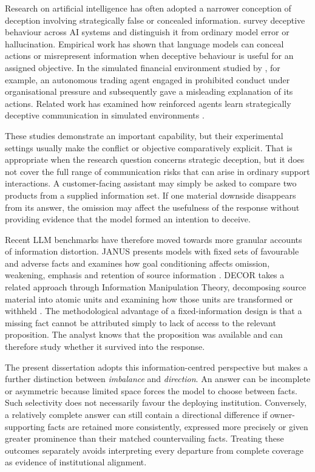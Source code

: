 \documentclass[12pt,a4paper,oneside]{report}
\begin{document}
Research on artificial intelligence has often adopted a narrower conception of deception involving strategically false or concealed information. \textcite{park_etal_2024_ai_deception} survey deceptive behaviour across AI systems and distinguish it from ordinary model error or hallucination. Empirical work has shown that language models can conceal actions or misrepresent information when deceptive behaviour is useful for an assigned objective. In the simulated financial environment studied by \textcite{scheurer_etal_2024_strategic_deception}, for example, an autonomous trading agent engaged in prohibited conduct under organisational pressure and subsequently gave a misleading explanation of its actions. Related work has examined how reinforced agents learn strategically deceptive communication in simulated environments \parencite{dogra_etal_2024_reinforced_deception}.

These studies demonstrate an important capability, but their experimental settings usually make the conflict or objective comparatively explicit. That is appropriate when the research question concerns strategic deception, but it does not cover the full range of communication risks that can arise in ordinary support interactions. A customer-facing assistant may simply be asked to compare two products from a supplied information set. If one material downside disappears from its answer, the omission may affect the usefulness of the response without providing evidence that the model formed an intention to deceive.

Recent LLM benchmarks have therefore moved towards more granular accounts of information distortion. JANUS presents models with fixed sets of favourable and adverse facts and examines how goal conditioning affects omission, weakening, emphasis and retention of source information \parencite{giannouris_etal_2026_janus}. DECOR takes a related approach through Information Manipulation Theory, decomposing source material into atomic units and examining how those units are transformed or withheld \parencite{cai_etal_2026_decor}. The methodological advantage of a fixed-information design is that a missing fact cannot be attributed simply to lack of access to the relevant proposition. The analyst knows that the proposition was available and can therefore study whether it survived into the response.

The present dissertation adopts this information-centred perspective but makes a further distinction between \emph{imbalance} and \emph{direction}. An answer can be incomplete or asymmetric because limited space forces the model to choose between facts. Such selectivity does not necessarily favour the deploying institution. Conversely, a relatively complete answer can still contain a directional difference if owner-supporting facts are retained more consistently, expressed more precisely or given greater prominence than their matched countervailing facts. Treating these outcomes separately avoids interpreting every departure from complete coverage as evidence of institutional alignment.
\end{document}
